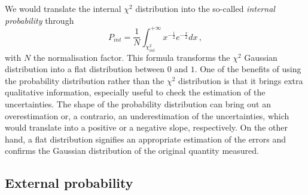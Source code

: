 We would translate the internal $\chi^{2}$ distribution into the so-called \emph{internal probability} through
\begin{equation}
  P_{int} = \frac{1}{N}\int_{\chi^{2}_{int}}^{+\infty}x^{-\frac{1}{2}}e^{-\frac{x}{2}}dx\,,
  \label{eq:chi2_Pint}
\end{equation}
with $N$ the normalisation factor.
This formula transforms the $\chi^{2}$ Gaussian distribution into a flat distribution between $0$ and $1$.
One of the benefits of using the probability distribution rather than the $\chi^{2}$ distribution is that it brings extra qualitative information, especially useful to check the estimation of the uncertainties.
The shape of the probability distribution can bring out an overestimation or, a contrario, an underestimation of the uncertainties, which would translate into a positive or a negative slope, respectively.
On the other hand, a flat distribution signifies an appropriate estimation of the errors and confirms the Gaussian distribution of the original quantity measured.



\subsection{External probability}
